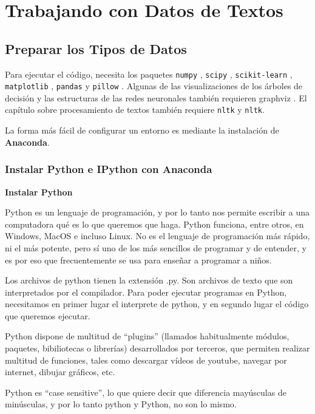 \documentclass[12pt, runningheads,a4]{book}
\begin{document}
\chapter{Trabajando con Datos de Textos} \label{cap.5}

\section{Preparar los Tipos de Datos}
Para ejecutar el código, necesita los paquetes \texttt{numpy} , \texttt{scipy} , \texttt{scikit-learn} , \texttt{matplotlib} , \texttt{pandas} y \texttt{pillow} . Algunas de las visualizaciones de los árboles de decisión y las estructuras de las redes neuronales también requieren graphviz . El capítulo sobre procesamiento de textos también requiere \texttt{nltk} y \texttt{nltk}.

La forma más fácil de configurar un entorno es mediante la instalación de \textbf{Anaconda}.


\subsection{Instalar Python e IPython con Anaconda}
\textbf{Instalar Python}

Python es un lenguaje de programación, y por lo tanto nos permite escribir a una computadora qué es lo que queremos que haga. Python funciona, entre otros, en Windows, MacOS e incluso Linux. No es el lenguaje de programación más rápido, ni el más potente, pero sí uno de los más sencillos de programar y de entender, y es por eso que frecuentemente se usa para enseñar a programar a niños.

Los archivos de python tienen la extensión .py. Son archivos de texto que son interpretados por el compilador. Para poder ejecutar programas en Python, necesitamos en primer lugar el interprete de python, y en segundo lugar el código que queremos ejecutar.

Python dispone de multitud de “plugins” (llamados habitualmente módulos, paquetes, bibiliotecas o librerías) desarrollados por terceros, que permiten realizar multitud de funciones, tales como descargar vídeos de youtube, navegar por internet, dibujar gráficos, etc.

Python es “case sensitive”, lo que quiere decir que diferencia mayúsculas de minúsculas, y por lo tanto python y Python, no son lo mismo.
\end{document}
